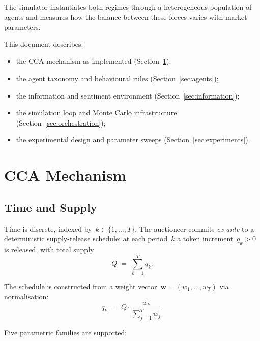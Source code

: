 \documentclass[11pt,a4paper]{article}
\begin{document}
The simulator instantiates both regimes through a heterogeneous population of agents and measures how the balance between these forces varies with market parameters.

This document describes:
\begin{itemize}[nosep]
  \item the CCA mechanism as implemented (Section~\ref{sec:mechanism});
  \item the agent taxonomy and behavioural rules (Section~\ref{sec:agents});
  \item the information and sentiment environment (Section~\ref{sec:information});
  \item the simulation loop and Monte Carlo infrastructure (Section~\ref{sec:orchestration});
  \item the experimental design and parameter sweeps (Section~\ref{sec:experiments}).
\end{itemize}


\section{CCA Mechanism}
\label{sec:mechanism}

\subsection{Time and Supply}
\label{sec:supply}

Time is discrete, indexed by~$k \in \{1,\dots,T\}$.  The auctioneer commits \emph{ex ante} to a deterministic supply-release schedule: at each period~$k$ a token increment~$q_k > 0$ is released, with total supply
\[
  Q \;=\; \sum_{k=1}^{T} q_k.
\]

The schedule is constructed from a weight vector~$\mathbf{w} = (w_1,\dots,w_T)$ via normalisation:
\begin{equation}\label{eq:supply-normalise}
  q_k \;=\; Q \cdot \frac{w_k}{\sum_{j=1}^{T} w_j}.
\end{equation}

Five parametric families are supported:
\end{document}
